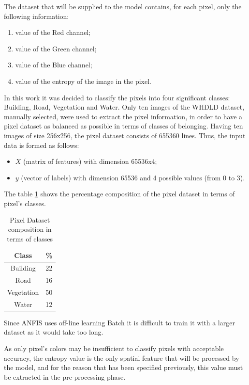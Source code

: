 \documentclass[10pt,twocolumn,letterpaper]{article}
\begin{document}
The dataset that will be supplied to the model contains, for each pixel, only the following information:
\begin{enumerate}
    \item value of the Red channel;
    \item value of the Green channel;
    \item value of the Blue channel;
    \item value of the entropy of the image in the pixel.
\end{enumerate}
In this work it was decided to classify the pixels into four significant classes: Building, Road, Vegetation and Water. Only ten images of the WHDLD dataset, manually selected, were used to extract the pixel information, in order to have a pixel dataset as balanced as possible in terms of classes of belonging. Having ten images of size 256x256, the pixel dataset consists of 655360 lines.
Thus, the input data is formed as follows:
\begin{itemize}
    \item $X$ (matrix of features) with dimension 65536x4;
    \item $y$ (vector of labels) with dimension 65536 and 4 possible values (from 0 to 3).
\end{itemize}

The table \ref{table:1} shows the percentage composition of the pixel dataset in terms of pixel's classes.

\begin{table}[h!]
\centering
\begin{tabular}{||c c||} 
 \hline
 Class & \% \\ [0.5ex] 
 \hline\hline
 Building & 22 \\ 
 Road & 16 \\
 Vegetation & 50 \\
 Water & 12 \\  [1ex] 
 \hline
\end{tabular}
\caption{Pixel Dataset composition in terms of classes}
\label{table:1}
\end{table}

Since ANFIS uses off-line learning Batch it is difficult to train it with a larger dataset as it would take too long.

As only pixel's colors may be insufficient to classify pixels with acceptable accuracy, the entropy value is the only spatial feature that will be processed by the model, and for the reason that has been specified previously, this value must be extracted in the pre-processing phase.
\end{document}
